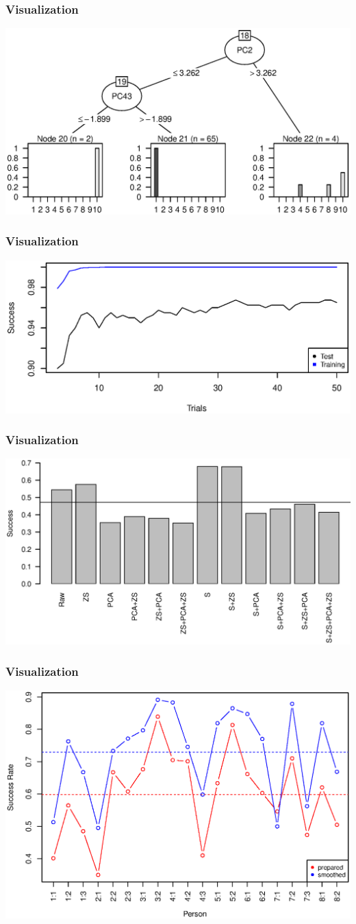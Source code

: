 \begin{frame}
\frametitle{Visualization}
\includegraphics[width = 0.9 \textwidth]{graphics/tree_section}
\end{frame}

\begin{frame}
\frametitle{Visualization}
\includegraphics[width = 0.9 \textwidth]{graphics/tree_boost_overfitting}
\end{frame}

\begin{frame}
\frametitle{Visualization}
\includegraphics[width = 0.9 \textwidth]{graphics/tree_total_all}
\end{frame}

\begin{frame}
\frametitle{Visualization}
\includegraphics[width = 0.9 \textwidth]{graphics/tree_performance_all_combined}
\end{frame}
